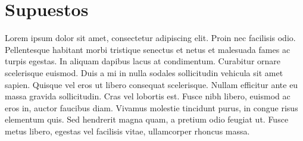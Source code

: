 \documentclass[../informe.tex]{subfiles}
\begin{document}
\section{Supuestos}\label{sec:supuestos}

Lorem ipsum dolor sit amet, consectetur adipiscing elit. Proin nec facilisis odio.
Pellentesque habitant morbi tristique senectus et netus et malesuada fames ac turpis egestas.
In aliquam dapibus lacus at condimentum. Curabitur ornare scelerisque euismod.
Duis a mi in nulla sodales sollicitudin vehicula sit amet sapien. Quisque vel eros ut libero
consequat scelerisque. Nullam efficitur ante eu massa gravida sollicitudin. Cras vel lobortis est.
Fusce nibh libero, euismod ac eros in, auctor faucibus diam. Vivamus molestie tincidunt purus,
in congue risus elementum quis. Sed hendrerit magna quam, a pretium odio feugiat ut.
Fusce metus libero, egestas vel facilisis vitae, ullamcorper rhoncus massa.


\end{document}
